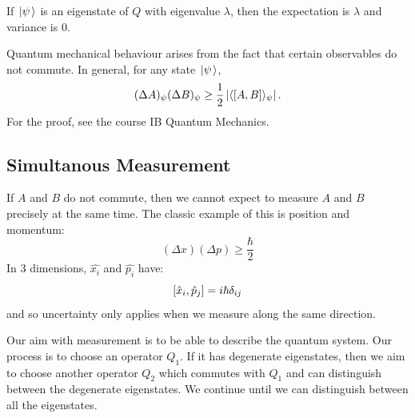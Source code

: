 \documentclass[../Main.tex]{subfiles}
\begin{document}
\begin{remark}
    If $\left.\left|\psi\right.\right\rangle$ is an eigenstate of $Q$ with eigenvalue $\lambda$, then the expectation is $\lambda$ and variance is $0$.
\end{remark}
Quantum mechanical behaviour arises from the fact that certain observables do not commute. In general, for any state $\left.\left|\psi\right.\right\rangle$,
\begin{equation*}
    (\Delta A)_\psi (\Delta B)_\psi \geq \frac12 \left|\langle \left[A, B\right] \rangle_\psi\right|.
\end{equation*}
For the proof, see the course IB Quantum Mechanics.
\subsection{Simultanous Measurement}
If $A$ and $B$ do not commute, then we cannot expect to measure $A$ and $B$ precisely at the same time. The classic example of this is position and momentum:
\begin{equation*}
    (\Delta x)(\Delta p) \geq \frac\hbar2
\end{equation*}
In 3 dimensions, $\hat{x_i}$ and $\hat{p_i}$ have:
\begin{equation*}
    \left[\hat{x}_i, \hat{p}_j\right] = i\hbar \delta_{ij}
\end{equation*}
and so uncertainty only applies when we measure along the same direction.

Our aim with measurement is to be able to describe the quantum system. Our process is to choose an operator $Q_1$. If it has degenerate eigenstates, then we aim to choose another operator $Q_2$ which commutes with $Q_1$ and can distinguish between the degenerate eigenstates. We continue until we can distinguish between all the eigenstates. 
\end{document}
